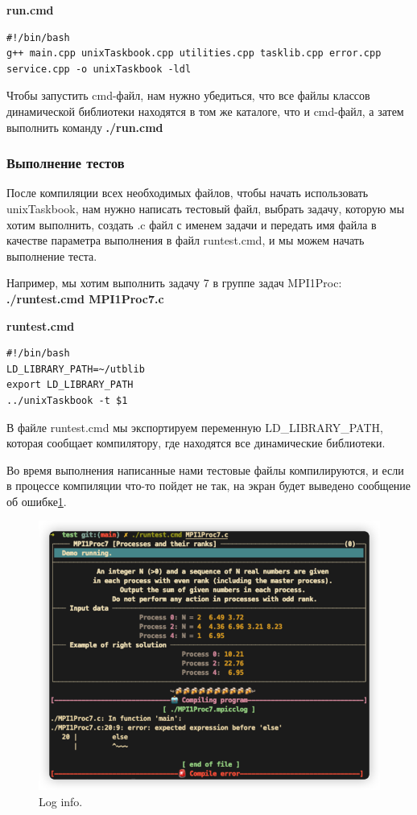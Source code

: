 \centerline{\textbf{run.cmd}}

\lstset{language=bash}
\begin{lstlisting}
#!/bin/bash
g++ main.cpp unixTaskbook.cpp utilities.cpp tasklib.cpp error.cpp service.cpp -o unixTaskbook -ldl
\end{lstlisting}

Чтобы запустить cmd-файл, нам нужно убедиться, что все файлы классов динамической 
библиотеки находятся в том же каталоге, что и cmd-файл, а затем выполнить команду \textbf{./run.cmd}

\subsubsection{Выполнение тестов}

После компиляции всех необходимых файлов, чтобы начать использовать unixTaskbook, нам 
нужно написать тестовый файл, выбрать задачу, которую мы хотим выполнить, создать .c файл 
с именем задачи и передать имя файла в качестве параметра выполнения в файл runtest.cmd, и 
мы можем начать выполнение теста.

Например, мы хотим выполнить задачу 7 в группе задач MPI1Proc: 
\\ \textbf{./runtest.cmd MPI1Proc7.c}

\centerline{\textbf{runtest.cmd}}

\lstset{language=bash}
\begin{lstlisting}
#!/bin/bash
LD_LIBRARY_PATH=~/utblib
export LD_LIBRARY_PATH
../unixTaskbook -t $1
\end{lstlisting}

В файле runtest.cmd мы экспортируем переменную LD\_LIBRARY\_PATH, 
которая сообщает компилятору, где находятся все динамические библиотеки.

Во время выполнения написанные нами тестовые файлы компилируются, и если в процессе компиляции что-то пойдет не так, на экран будет выведено сообщение об ошибке\ref{error}.
\begin{figure}[htbp]%
    \centering
    \includegraphics[width=1\linewidth]{images/error.jpg}%
    \caption{Log info.}%
    \label{error}%
\end{figure}


